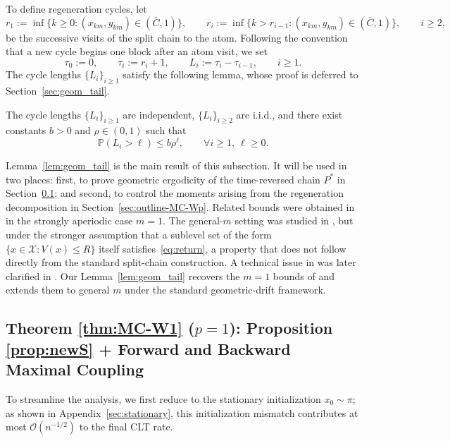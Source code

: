 \documentclass[mnsc,nonblindrev]{informs3}
\begin{document}
To define regeneration cycles, let
\[
r_1:=\inf\{k\ge0:(x_{km}, y_{km})\in(\bar C,1)\},
\qquad
r_i:=\inf\{k>r_{i-1}:(x_{km}, y_{km})\in(\bar C,1)\},
\qquad i\ge2,
\]
be the successive visits of the split chain to the atom. Following the
convention that a new cycle begins one block after an atom visit, we set
\[
\tau_0:=0,
\qquad
\tau_i:=r_i+1,
\qquad
L_i:=\tau_i-\tau_{i-1},
\qquad i\ge1.
\]
The cycle lengths \(\{L_i\}_{i\ge1}\) satisfy the following lemma, whose proof is
deferred to Section~\ref{sec:geom_tail}.

\begin{lemma}\label{lem:geom_tail}
The cycle lengths \(\{L_i\}_{i\ge 1}\) are independent, \(\{L_i\}_{i\ge 2}\) are i.i.d., and there exist constants \(b>0\) and \(\rho\in(0,1)\) such that
\[
\mathbb P(L_i>\ell)\le b\rho^\ell,
\qquad \forall i\ge 1,\ \ell\ge 0.
\]
\end{lemma}

Lemma~\ref{lem:geom_tail} is the main result of this subsection. It will be used in two places: first, to prove geometric ergodicity of the time-reversed chain \(P^\ast\) in Section~\ref{sec:outline-MC-W1}; and second, to control the moments arising from the regeneration decomposition in Section~\ref{sec:outline-MC-Wp}. Related bounds were obtained in \cite{roberts1999bounds} in the strongly aperiodic case \(m=1\). The general-\(m\) setting was studied in \cite{rosenthal1995minorization}, but under the stronger assumption that a sublevel set of the form \(\{x \in \mathcal X : V(x)\le R\}\) itself satisfies~\eqref{eq:return}, a property that does not follow directly from the standard split-chain construction. A technical issue in \cite{rosenthal1995minorization} was later clarified in \cite{roberts1999bounds}. Our Lemma~\ref{lem:geom_tail} recovers the \(m=1\) bounds of \cite{roberts1999bounds} and extends them to general \(m\) under the standard geometric-drift framework.

\subsection{Theorem \ref{thm:MC-W1} ($p = 1$): Proposition \ref{prop:newS} + Forward and Backward Maximal Coupling}\label{sec:outline-MC-W1}
To streamline the analysis, we first reduce to the stationary initialization $x_0\sim\pi$;
as shown in Appendix~\ref{sec:stationary}, this initialization mismatch contributes at most
$\mathcal O(n^{-1/2})$ to the final CLT rate. 
\end{document}
